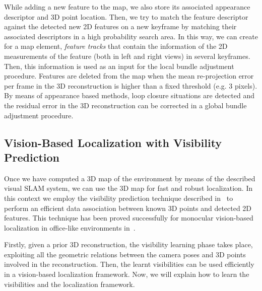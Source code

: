 While adding a new feature to the map, we also store its associated appearance descriptor and 3D point location. Then, we try to match the feature descriptor against the detected new 2D features
on a new keyframe by matching their associated descriptors in a high probability search area. In this way, we can create for a map element, \textit{feature tracks} that contain the information of the 2D
measurements of the feature (both in left and right views) in several keyframes. Then, this information is used as an input for the local bundle adjustment procedure. Features are deleted from the map when
the mean re-projection error per frame in the 3D reconstruction is higher than a fixed threshold (e.g. 3 pixels). By means of appearance based methods, loop closure situations are detected and the residual error in the 3D reconstruction can be corrected in a global bundle adjustment procedure.

\subsection{Vision-Based Localization with Visibility Prediction}\label{sec:vision_localization}
Once we have computed a 3D map of the environment by means of the described visual SLAM system, we can use the 3D map for fast and robust localization. In this context we employ the visibility prediction technique described in~\cite{Alcantarilla11icra} to perform an efficient data association between known 3D points and detected 2D features. This technique has been proved successfully for monocular vision-based localization in office-like environments in~\cite{Alcantarilla10icra}.

Firstly, given a prior 3D reconstruction, the visibility learning phase takes place, exploiting all the geometric relations between the camera poses and 3D points involved in the reconstruction. Then, the learnt visibilities can be used efficiently in a vision-based localization framework. Now, we will explain how to learn the visibilities and the localization framework.

